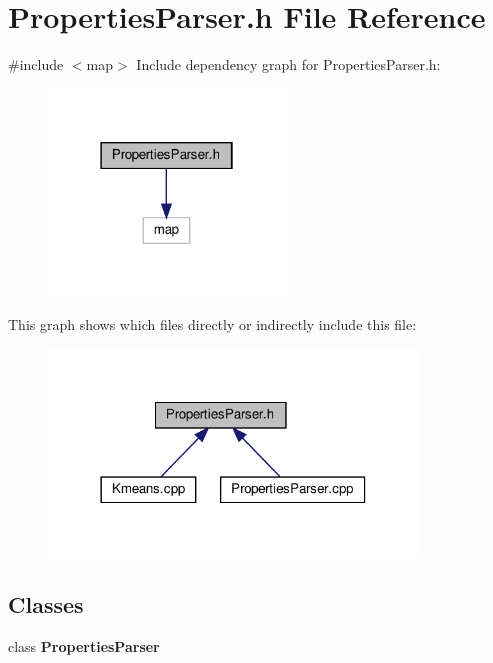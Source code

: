 \section{Properties\+Parser.\+h File Reference}
\label{_properties_parser_8h}
{\ttfamily \#include $<$map$>$}\newline
Include dependency graph for Properties\+Parser.\+h\+:\nopagebreak
\begin{figure}[H]
\begin{center}
\leavevmode
\includegraphics[width=178pt]{_properties_parser_8h__incl}
\end{center}
\end{figure}
This graph shows which files directly or indirectly include this file\+:\nopagebreak
\begin{figure}[H]
\begin{center}
\leavevmode
\includegraphics[width=278pt]{_properties_parser_8h__dep__incl}
\end{center}
\end{figure}
\subsection*{Classes}
\begin{DoxyCompactItemize}
\item 
class \textbf{ Properties\+Parser}
\end{DoxyCompactItemize}
